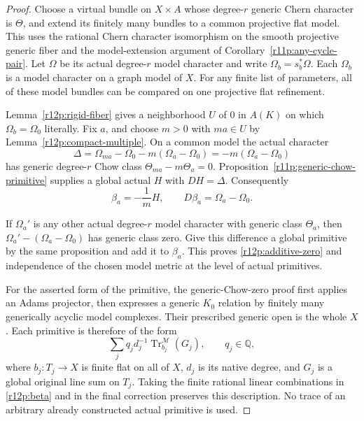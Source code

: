 \begin{proof}
Choose a virtual bundle on $X\times A$ whose degree-$r$ generic
Chern character is $\Theta$, and extend its finitely many bundles
to a common projective flat model.  This uses the rational Chern
character isomorphism on the smooth projective generic fiber and
the model-extension argument of Corollary~\ref{r11p:any-cycle-pair}.
Let $\Omega$ be its actual degree-$r$ model character and write
$\Omega_b=s_b^*\Omega$.  Each $\Omega_b$ is a model character on a
graph model of $X$.  For any finite list of parameters, all of these
model bundles can be compared on one projective flat refinement.

Lemma~\ref{r12p:rigid-fiber} gives a neighborhood $U$ of $0$ in
$A(K)$ on which $\Omega_b=\Omega_0$ literally.  Fix $a$, and choose
$m>0$ with $ma\in U$ by Lemma~\ref{r12p:compact-multiple}.  On a
common model the actual character
\[
 \Delta=\Omega_{ma}-\Omega_0-m(\Omega_a-\Omega_0)
                 =-m(\Omega_a-\Omega_0)
\tag{R12.P5}\label{r12p:delta}
\]
has generic degree-$r$ Chow class
$\Theta_{ma}-m\Theta_a=0$.  Proposition~\ref{r11p:generic-chow-primitive} supplies a global actual $H$ with $DH=\Delta$.
Consequently
\[
                 \beta_a=-\frac{1}{m}H,
                 \qquad D\beta_a=\Omega_a-\Omega_0.
\tag{R12.P6}\label{r12p:beta}
\]

If $\Omega_a'$ is any other actual degree-$r$ model character with
generic class $\Theta_a$, then
$\Omega_a'-(\Omega_a-\Omega_0)$ has generic class zero.  Give this
difference a global primitive by the same proposition and add it to
$\beta_a$.  This proves \eqref{r12p:additive-zero} and independence
of the chosen model metric at the level of actual primitives.

For the asserted form of the primitive, the generic-Chow-zero proof
first applies an Adams projector, then expresses a generic $K_0$
relation by finitely many generically acyclic model complexes.
Their prescribed generic open is the whole $X$.  Each primitive is
therefore of the form
\[
       \sum_j q_jd_j^{-1}\operatorname{Tr}^{\mathscr M}_{b_j}(G_j),
       \qquad q_j\in\mathbb Q,
\tag{R12.P7}\label{r12p:certificate}
\]
where $b_j:T_j\to X$ is finite flat on all of $X$, $d_j$ is its
native degree, and $G_j$ is a global original line sum on $T_j$.
Taking the finite rational linear combinations in
\eqref{r12p:beta} and in the final correction preserves this
description.  No trace of an arbitrary already constructed actual
primitive is used.
\end{proof}


